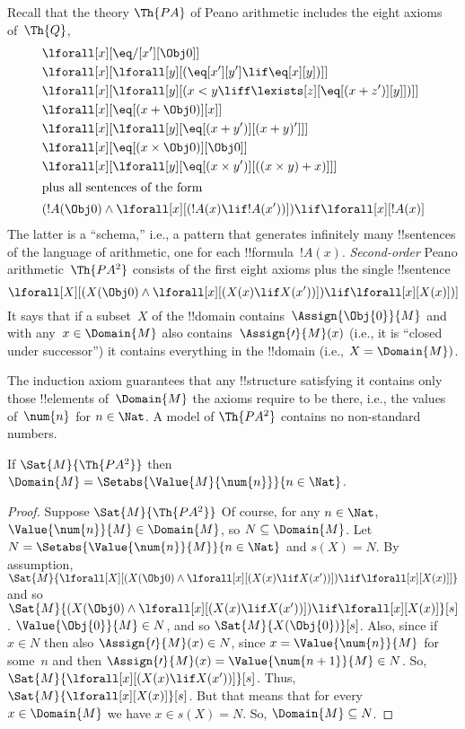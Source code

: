 \documentclass[../../../include/open-logic-section]{subfiles}
\begin{document}


Recall that the theory $\Th{PA}$ of Peano arithmetic includes the
eight axioms of~$\Th{Q}$,
\begin{align*}
& \lforall[x][\eq/[x'][\Obj 0]]\\
& \lforall[x][\lforall[y][(\eq[x'][y'] \lif \eq[x][y])]]\\
& \lforall[x][\lforall[y][(x < y \liff \lexists[z][\eq[(x + z')][y]])]]\\
& \lforall[x][\eq[(x + \Obj 0)][x]]\\
& \lforall[x][\lforall[y][\eq[(x + y')][(x + y)']]]\\
& \lforall[x][\eq[(x \times \Obj 0)][\Obj 0]]\\
& \lforall[x][\lforall[y][\eq[(x \times y')][((x \times y) + x)]]]\\
\intertext{plus all sentences of the form}
& (!A(\Obj 0) \land \lforall[x][(!A(x) \lif !A(x'))]) \lif \lforall[x][!A(x)]
\end{align*}
The latter is a ``schema,'' i.e., a pattern that generates infinitely
many !!{sentence}s of the language of arithmetic, one for each
!!{formula}~$!A(x)$. \emph{Second-order} Peano arithmetic~$\Th{PA^2}$
consists of the first eight axioms plus the single !!{sentence}
\[
\lforall[X][(X(\Obj 0) \land \lforall[x][(X(x) \lif X(x'))]) \lif \lforall[x][X(x)])]
\]
It says that if a subset~$X$ of the !!{domain}
contains~$\Assign{\Obj{0}}{M}$ and with any~$x \in \Domain{M}$ also
contains~$\Assign{\prime}{M}(x)$ (i.e., it is ``closed under
successor'') it contains everything in the !!{domain} (i.e., $X =
\Domain{M})$.

The induction axiom guarantees that any !!{structure} satisfying it
contains only those !!{element}s of~$\Domain{M}$ the axioms require to
be there, i.e., the values of~$\num{n}$ for $n \in \Nat$. A model of
$\Th{PA^2}$ contains no non-standard numbers.

\begin{thm}
If $\Sat{M}{\Th{PA^2}}$ then $\Domain{M} =
\Setabs{\Value{M}{\num{n}}}{n \in \Nat}$.
\end{thm}

\begin{proof}
Suppose $\Sat{M}{\Th{PA^2}}$ Of course, for any $n \in \Nat$,
$\Value{\num{n}}{M} \in \Domain{M}$, so $N \subseteq \Domain{M}$. Let
$N = \Setabs{\Value{\num{n}}{M}}{n \in \Nat}$ and $s(X) = N$. By
assumption, $\Sat{M}{\lforall[X][(X(\Obj 0) \land \lforall[x][(X(x)
      \lif X(x'))]) \lif \lforall[x][X(x)]]}$ and so $\Sat{M}{(X(\Obj
  0) \land \lforall[x][(X(x) \lif X(x'))]) \lif
  \lforall[x][X(x)]}[s]$. $\Value{\Obj{0}}{M} \in N$, and so
$\Sat{M}{X(\Obj{0})}[s]$. Also, since if $x \in N$ then also
$\Assign{\prime}{M}(x) \in N$, since $x = \Value{\num{n}}{M}$ for
some~$n$ and then $\Assign{\prime}{M}(x) = \Value{\num{n+1}}{M} \in
N$. So, $\Sat{M}{\lforall[x][(X(x) \lif X(x'))]}[s]$. Thus,
$\Sat{M}{\lforall[x][X(x)]}[s]$. But that means that for every $x \in
\Domain{M}$ we have $x \in s(X) = N$. So, $\Domain{M} \subseteq N$.
\end{proof}
\end{document}
